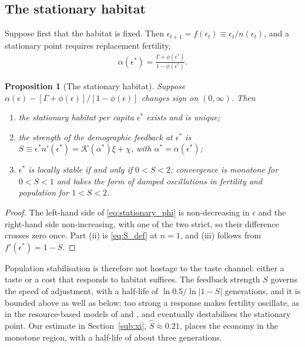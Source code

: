 \documentclass[11pt]{article}
\newtheorem{proposition}{Proposition}
\begin{document}
\subsection{The stationary habitat}
\label{sub:stationary}
Suppose first that the habitat is fixed. Then $\epsilon_{t+1}=f(\epsilon_t)\equiv\epsilon_t/n(\epsilon_t)$,
and a stationary point requires replacement fertility,
\begin{align}
\alpha(\epsilon^\ast)=\frac{\Gamma+\phi(\epsilon^\ast)}{1-\phi(\epsilon^\ast)} .
\label{eq:stationary_phi}
\end{align}

\begin{proposition}[The stationary habitat]
\label{prop:two_channels}
\label{rem:eps_stability_hab}
Suppose $\alpha(\epsilon)-[\Gamma+\phi(\epsilon)]/[1-\phi(\epsilon)]$ changes sign on $(0,\infty)$. Then
\begin{enumerate}
\item[(i)] the stationary habitat per capita $\epsilon^\ast$ exists and is unique;
\item[(ii)] the strength of the demographic feedback at $\epsilon^\ast$ is
$S\equiv\epsilon^\ast n'(\epsilon^\ast)=\mathcal{K}(\alpha^\ast)\xi+\chi$, with $\alpha^\ast=\alpha(\epsilon^\ast)$;
\item[(iii)] $\epsilon^\ast$ is locally stable if and only if $0<S<2$; convergence is monotone for
$0<S<1$ and takes the form of damped oscillations in fertility and population for $1<S<2$.
\end{enumerate}
\end{proposition}

\begin{proof}
The left-hand side of \eqref{eq:stationary_phi} is non-decreasing in $\epsilon$ and the right-hand side
non-increasing, with one of the two strict, so their difference crosses zero once. Part (ii) is
\eqref{eq:S_def} at $n=1$, and (iii) follows from $f'(\epsilon^\ast)=1-S$.
\end{proof}

Population stabilisation is therefore not hostage to the taste channel: either a taste or a cost that
responds to habitat suffices. The feedback strength $S$ governs the speed of adjustment, with a
half-life of $\ln0.5/\ln|1-S|$ generations, and it is bounded above as well as below: too strong a
response makes fertility oscillate, as in the resource-based models of \citet{Brander1998} and
\citet{lagerlof2006}, and eventually destabilises the stationary point. Our estimate in
Section~\ref{sub:xi}, $\hat S\approx0.21$, places the economy in the monotone region, with a half-life of
about three generations.
\end{document}

